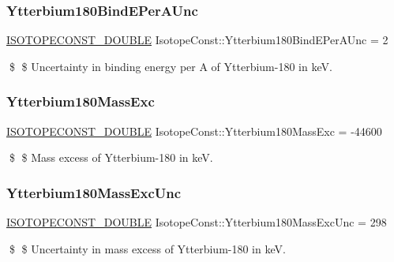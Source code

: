 \subsubsection{\texorpdfstring{Ytterbium180\+Bind\+E\+Per\+A\+Unc}{Ytterbium180BindEPerAUnc}}
{\footnotesize\ttfamily \mbox{\hyperlink{group___isotope_const-_macros_ga8f45a7272ce02c0b4c65c44636ed719a}{I\+S\+O\+T\+O\+P\+E\+C\+O\+N\+S\+T\+\_\+\+D\+O\+U\+B\+LE}} Isotope\+Const\+::\+Ytterbium180\+Bind\+E\+Per\+A\+Unc = 2}

\$ \$ Uncertainty in binding energy per A of Ytterbium-\/180 in keV. \mbox{\label{group___isotope_const-_ytterbium-_yb180_ga0571af7e14078b0df2eba842ca11c7f9}} 
\subsubsection{\texorpdfstring{Ytterbium180\+Mass\+Exc}{Ytterbium180MassExc}}
{\footnotesize\ttfamily \mbox{\hyperlink{group___isotope_const-_macros_ga8f45a7272ce02c0b4c65c44636ed719a}{I\+S\+O\+T\+O\+P\+E\+C\+O\+N\+S\+T\+\_\+\+D\+O\+U\+B\+LE}} Isotope\+Const\+::\+Ytterbium180\+Mass\+Exc = -\/44600}

\$ \$ Mass excess of Ytterbium-\/180 in keV. \mbox{\label{group___isotope_const-_ytterbium-_yb180_gaf01853e05135e016601fa16a115063a9}} 
\subsubsection{\texorpdfstring{Ytterbium180\+Mass\+Exc\+Unc}{Ytterbium180MassExcUnc}}
{\footnotesize\ttfamily \mbox{\hyperlink{group___isotope_const-_macros_ga8f45a7272ce02c0b4c65c44636ed719a}{I\+S\+O\+T\+O\+P\+E\+C\+O\+N\+S\+T\+\_\+\+D\+O\+U\+B\+LE}} Isotope\+Const\+::\+Ytterbium180\+Mass\+Exc\+Unc = 298}

\$ \$ Uncertainty in mass excess of Ytterbium-\/180 in keV. \mbox{\label{group___isotope_const-_ytterbium-_yb180_gab6ebe37a128643b29631e97cea638ff4}} 
